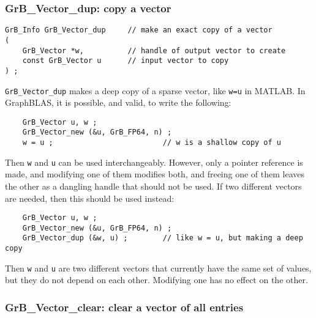 \documentclass[12pt]{article}
\begin{document}
\newpage
\subsubsection{{\sf GrB\_Vector\_dup:}           copy a vector}
\label{vector_dup}

\begin{mdframed}[userdefinedwidth=6in]
{\footnotesize
\begin{verbatim}
GrB_Info GrB_Vector_dup     // make an exact copy of a vector
(
    GrB_Vector *w,          // handle of output vector to create
    const GrB_Vector u      // input vector to copy
) ;
\end{verbatim}
} \end{mdframed}

\verb'GrB_Vector_dup' makes a deep copy of a sparse vector, like \verb'w=u' in
MATLAB.  In GraphBLAS, it is possible, and valid, to write the following:

    {\footnotesize
    \begin{verbatim}
    GrB_Vector u, w ;
    GrB_Vector_new (&u, GrB_FP64, n) ;
    w = u ;                         // w is a shallow copy of u  \end{verbatim}}

Then \verb'w' and \verb'u' can be used interchangeably.  However, only a pointer
reference is made, and modifying one of them modifies both, and freeing one of
them leaves the other as a dangling handle that should not be used.
If two different vectors are needed, then this should be used instead:

    {\footnotesize
    \begin{verbatim}
    GrB_Vector u, w ;
    GrB_Vector_new (&u, GrB_FP64, n) ;
    GrB_Vector_dup (&w, u) ;        // like w = u, but making a deep copy \end{verbatim}}

Then \verb'w' and \verb'u' are two different vectors that currently have the
same set of values, but they do not depend on each other.  Modifying one has
no effect on the other.

\subsubsection{{\sf GrB\_Vector\_clear:}         clear a vector of all entries}
\label{vector_clear}
\end{document}
